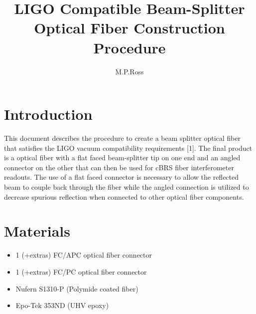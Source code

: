 \documentclass{article}
\title{LIGO Compatible Beam-Splitter Optical Fiber Construction Procedure}
\author{M.P.Ross}
\begin{document}
\maketitle
\section{Introduction}
This document describes the procedure to create a beam splitter optical fiber that satisfies the LIGO vacuum compatibility requirements [1]. The final product is a optical fiber with a flat faced beam-splitter tip on one end and an angled connector on the other that can then be used for cBRS fiber interferometer readouts. The use of a flat faced connector is necessary to allow the reflected beam to couple back through the fiber while the angled connection is utilized to decrease spurious reflection when connected to other optical fiber components.
\section{Materials}
\begin{itemize}
\item 1 (+extras) FC/APC optical fiber connector
\item 1 (+extras) FC/PC optical fiber connector
\item Nufern S1310-P (Polymide coated fiber)
\item Epo-Tek 353ND (UHV epoxy)
\end{itemize}
\end{document}
